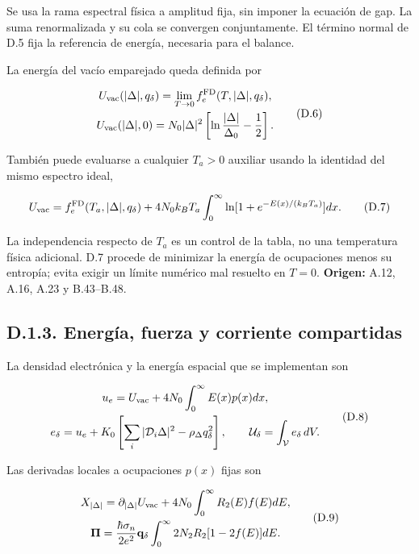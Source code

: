 \documentclass[
  spanish,
  10pt,
  a4paper,
]{article}
\begin{document}
Se usa la rama espectral física a amplitud fija, sin imponer la ecuación
de gap. La suma renormalizada y su cola se convergen conjuntamente. El
término normal de D.5 fija la referencia de energía, necesaria para el
balance.

La energía del vacío emparejado queda definida por

\[
\begin{gathered}
U_{\rm vac}(|\Delta|,q_\delta)=\lim_{T\to0}f_e^{\rm FD}(T,|\Delta|,q_\delta),\\
U_{\rm vac}(|\Delta|,0)=N_0|\Delta|^2
\left[\ln\frac{|\Delta|}{\Delta_0}-\frac12\right].
\end{gathered}\tag{D.6}
\]

También puede evaluarse a cualquier \(T_a>0\) auxiliar usando la
identidad del mismo espectro ideal,

\[
U_{\rm vac}=f_e^{\rm FD}(T_a,|\Delta|,q_\delta)
+4N_0k_BT_a\int_0^\infty\ln[1+e^{-E(x)/(k_BT_a)}]dx.
\tag{D.7}
\]

La independencia respecto de \(T_a\) es un control de la tabla, no una
temperatura física adicional. D.7 procede de minimizar la energía de
ocupaciones menos su entropía; evita exigir un límite numérico mal
resuelto en \(T=0\). \textbf{Origen:} A.12, A.16, A.23 y B.43--B.48.

\subsection{D.1.3. Energía, fuerza y corriente
compartidas}\label{d.1.3.-energuxeda-fuerza-y-corriente-compartidas}

La densidad electrónica y la energía espacial que se implementan son

\[
\begin{gathered}
u_e=U_{\rm vac}+4N_0\int_0^\infty E(x)p(x)dx,\\
e_\delta=u_e+K_0\left[\sum_i|\mathcal D_i\Delta|^2-\rho_\Delta q_\delta^2\right],
\qquad\mathcal U_\delta=\int_{\mathcal V}e_\delta\,dV.
\end{gathered}\tag{D.8}
\]

Las derivadas locales a ocupaciones \(p(x)\) fijas son

\[
\begin{gathered}
X_{|\Delta|}=\partial_{|\Delta|}U_{\rm vac}
+4N_0\int_0^\infty R_2(E)f(E)dE,\\
\boldsymbol\Pi=\frac{\hbar\sigma_n}{2e^2}\mathbf q_\delta
\int_0^\infty2N_2R_2[1-2f(E)]dE.
\end{gathered}\tag{D.9}
\]
\end{document}
